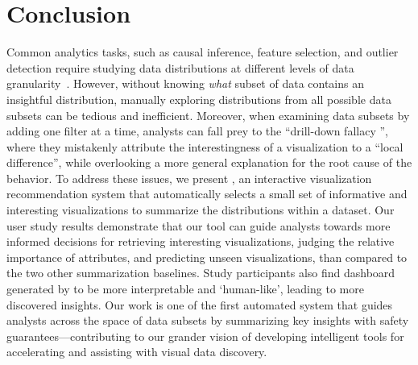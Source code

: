 \section{Conclusion}
\par Common analytics tasks, such as causal inference, feature selection, and outlier detection require studying data distributions at different levels of data granularity~\cite{Anand2015,Wu2013,Heer2012}. However, without knowing \textit{what} subset of data contains an insightful distribution, manually exploring distributions from all possible data subsets can be tedious and inefficient. Moreover, when examining data subsets by adding one filter at a time, analysts can fall prey to the ``drill-down fallacy '', where they mistakenly attribute the interestingness of a visualization to a ``local difference'', while overlooking a more general explanation for the root cause of the behavior. To address these issues, we present \system, an interactive visualization recommendation system that automatically selects a small set of informative and interesting visualizations to summarize the distributions within a dataset. Our user study results demonstrate that our tool can guide analysts towards more informed decisions for retrieving interesting visualizations, judging the relative importance of attributes, and predicting unseen visualizations, than compared to the two other summarization baselines. Study participants also find dashboard generated by \system to be more interpretable and `human-like', leading to more discovered insights. Our work is one of the first automated system that guides analysts across the space of data subsets by summarizing key insights with safety guarantees---contributing to our grander vision of developing intelligent tools for accelerating and assisting with visual data discovery.  
